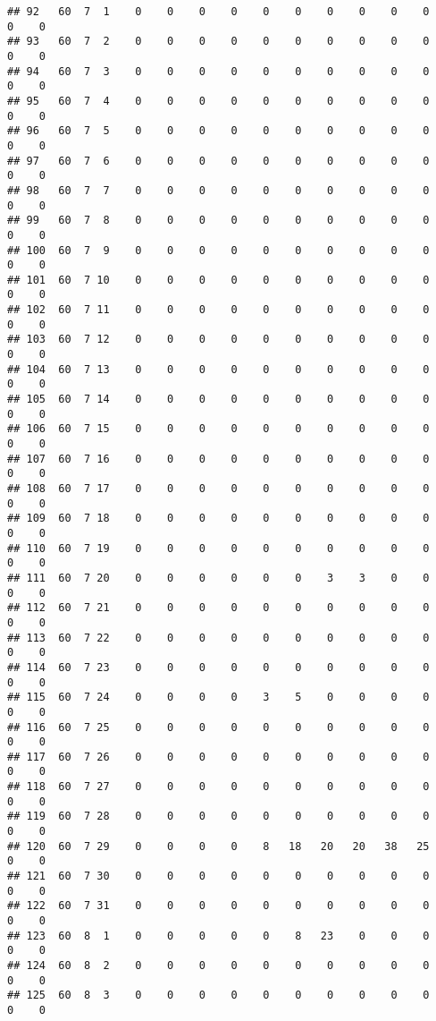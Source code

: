 \documentclass[]{article}
\begin{document}
\begin{verbatim}
## 92   60  7  1    0    0    0    0    0    0    0    0    0    0    0    0
## 93   60  7  2    0    0    0    0    0    0    0    0    0    0    0    0
## 94   60  7  3    0    0    0    0    0    0    0    0    0    0    0    0
## 95   60  7  4    0    0    0    0    0    0    0    0    0    0    0    0
## 96   60  7  5    0    0    0    0    0    0    0    0    0    0    0    0
## 97   60  7  6    0    0    0    0    0    0    0    0    0    0    0    0
## 98   60  7  7    0    0    0    0    0    0    0    0    0    0    0    0
## 99   60  7  8    0    0    0    0    0    0    0    0    0    0    0    0
## 100  60  7  9    0    0    0    0    0    0    0    0    0    0    0    0
## 101  60  7 10    0    0    0    0    0    0    0    0    0    0    0    0
## 102  60  7 11    0    0    0    0    0    0    0    0    0    0    0    0
## 103  60  7 12    0    0    0    0    0    0    0    0    0    0    0    0
## 104  60  7 13    0    0    0    0    0    0    0    0    0    0    0    0
## 105  60  7 14    0    0    0    0    0    0    0    0    0    0    0    0
## 106  60  7 15    0    0    0    0    0    0    0    0    0    0    0    0
## 107  60  7 16    0    0    0    0    0    0    0    0    0    0    0    0
## 108  60  7 17    0    0    0    0    0    0    0    0    0    0    0    0
## 109  60  7 18    0    0    0    0    0    0    0    0    0    0    0    0
## 110  60  7 19    0    0    0    0    0    0    0    0    0    0    0    0
## 111  60  7 20    0    0    0    0    0    0    3    3    0    0    0    0
## 112  60  7 21    0    0    0    0    0    0    0    0    0    0    0    0
## 113  60  7 22    0    0    0    0    0    0    0    0    0    0    0    0
## 114  60  7 23    0    0    0    0    0    0    0    0    0    0    0    0
## 115  60  7 24    0    0    0    0    3    5    0    0    0    0    0    0
## 116  60  7 25    0    0    0    0    0    0    0    0    0    0    0    0
## 117  60  7 26    0    0    0    0    0    0    0    0    0    0    0    0
## 118  60  7 27    0    0    0    0    0    0    0    0    0    0    0    0
## 119  60  7 28    0    0    0    0    0    0    0    0    0    0    0    0
## 120  60  7 29    0    0    0    0    8   18   20   20   38   25    0    0
## 121  60  7 30    0    0    0    0    0    0    0    0    0    0    0    0
## 122  60  7 31    0    0    0    0    0    0    0    0    0    0    0    0
## 123  60  8  1    0    0    0    0    0    8   23    0    0    0    0    0
## 124  60  8  2    0    0    0    0    0    0    0    0    0    0    0    0
## 125  60  8  3    0    0    0    0    0    0    0    0    0    0    0    0

\end{verbatim}
\end{document}
